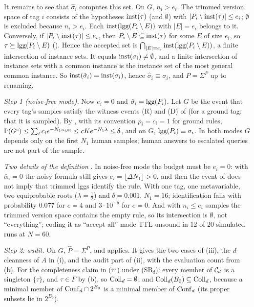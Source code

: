 It remains to see that $\hat\sigma_i$ computes this set. On $G$, $n_i>e_i$. The trimmed version space of tag $i$ consists of the hypotheses $\mathrm{inst}(\tau)$ (and $\emptyset$) with $|P_i\setminus\mathrm{inst}(\tau)|\le e_i$; $\emptyset$ is excluded because $n_i>e_i$. Each $\mathrm{inst}(\mathrm{lgg}(P_i\setminus E))$ with $|E|=e_i$ belongs to it. Conversely, if $|P_i\setminus\mathrm{inst}(\tau)|\le e_i$, then $P_i\setminus E\subseteq\mathrm{inst}(\tau)$ for some $E$ of size $e_i$, so $\tau\succeq\mathrm{lgg}(P_i\setminus E)$ (). Hence the accepted set is $\bigcap_{|E|=e_i}\mathrm{inst}(\mathrm{lgg}(P_i\setminus E))$, a finite intersection of instance sets. It equals $\mathrm{inst}(\sigma_i)\neq\emptyset$, and a finite intersection of instance sets with a common instance is the instance set of the most general common instance. So $\mathrm{inst}(\hat\sigma_i)=\mathrm{inst}(\sigma_i)$, hence $\hat\sigma_i\equiv\sigma_i$, and $\hat P=\Sigma^P$ up to renaming.

\emph{Step 1 (noise-free mode).} Now $e_i=0$ and $\hat\sigma_i=\mathrm{lgg}(P_i)$. Let $G$ be the event that every tag's samples satisfy the witness events (R) and (D) of  (for a ground tag: that it is sampled). By , with its convention $\rho_i=c_i=1$ for ground rules, $\mathbb{P}(G^c)\le\sum_ic_ie^{-N_1\pi_i\rho_i}\le cKe^{-N_1\lambda}\le\delta$, and on $G$, $\mathrm{lgg}(P_i)\equiv\sigma_i$. In both modes $G$ depends only on the first $N_1$ human samples; human answers to escalated queries are not part of the sample.

\emph{Two details of the definition} . In noise-free mode the budget must be $e_i=0$: with $\bar\alpha_i=0$ the noisy formula still gives $e_i=\lfloor\Delta N_1\rfloor>0$, and then the event of  does not imply that trimmed lggs identify the rule. With one tag, one metavariable, two equiprobable roots ($\lambda=\frac12$) and $\delta=0.001$, $N_1=16$; identification fails with probability $0.077$ for $e=4$ and $3\cdot10^{-5}$ for $e=0$. And with $n_i\le e_i$ samples the trimmed version space contains the empty rule, so its intersection is $\emptyset$, not ``everything''; coding it as ``accept all'' made TTL unsound in 12 of 20 simulated runs at $N=60$.

\emph{Step 2: audit.} On $G$, $\hat P=\Sigma^P$, and  applies. It gives the two cases of (iii), the $d$-cleanness of $A$ in (i), and the audit part of (ii), with the evaluation count from (b). For the completeness claim in (iii) under (SB$_d$): every member of $\mathcal{C}_d$ is a singleton $\{\tau\}$, and $\tau\in F$ by (b), so $\mathrm{Coll}_d=\emptyset$; and $\mathrm{Coll}_d(B_0)\subseteq\mathrm{Coll}_d$, because a minimal member of $\mathrm{Conf}_d\cap2^{B_0}$ is a minimal member of $\mathrm{Conf}_d$ (its proper subsets lie in $2^{B_0}$).

